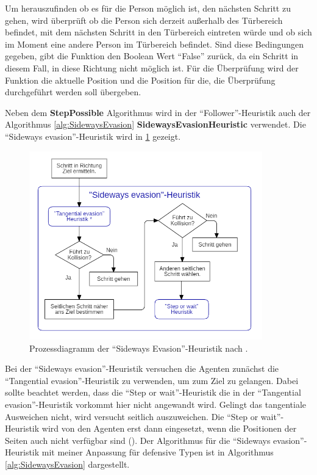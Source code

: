 Um herauszufinden ob es für die Person möglich ist, den nächsten Schritt zu gehen, wird überprüft ob die Person sich derzeit außerhalb des Türbereich befindet, mit dem nächsten Schritt in den Türbereich eintreten würde und ob sich im Moment eine andere Person im Türbereich befindet. Sind diese Bedingungen gegeben, gibt die Funktion den Boolean Wert "`False"' zurück, da ein Schritt in diesem Fall, in diese Richtung nicht möglich ist. Für die Überprüfung wird der Funktion die aktuelle Position und die Position für die, die Überprüfung durchgeführt werden soll übergeben.

Neben dem \textbf{StepPossible} Algorithmus wird in der "`Follower"'-Heuristik auch der Algorithmus \ref{alg:SidewaysEvasion} \textbf{SidewaysEvasionHeuristic} verwendet. Die "`Sideways evasion"'-Heuristik wird in \figurename \ref{fig:sidewayHeuristik} gezeigt.
\begin{figure}[H]
	\centering
		\includegraphics[width=0.9\textwidth]{pictures/model/algorithm/heuristics/sideways_evasion_heuristic.png}
	\caption{Prozessdiagramm der "`Sideways Evasion"'-Heuristik nach \cite{Seitz.2016}.}
	\label{fig:sidewayHeuristik}
\end{figure} 
Bei der "`Sideways evasion"'-Heuristik versuchen die Agenten zunächst die "`Tangential evasion"'-Heuristik zu verwenden, um zum Ziel zu gelangen. Dabei sollte beachtet werden, dass die "`Step or wait"'-Heuristik die in  der "`Tangential evasion"'-Heuristik vorkommt hier nicht angewandt wird. Gelingt das tangentiale Ausweichen nicht, wird versucht seitlich auszuweichen. Die "`Step or wait"'-Heuristik wird von den Agenten erst dann eingesetzt, wenn die Positionen der Seiten auch nicht verfügbar sind (\cite{Seitz.2016}). Der Algorithmus für die "`Sideways evasion"'-Heuristik mit meiner Anpassung für defensive Typen ist in Algorithmus \ref{alg:SidewaysEvasion} dargestellt.

